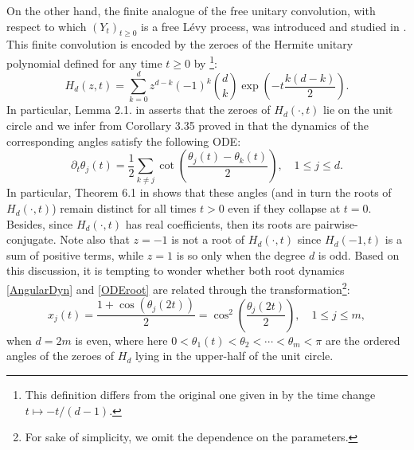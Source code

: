 \documentclass[12pt,reqno]{amsart}
\begin{document}
On the other hand, the finite analogue of the free unitary convolution, with respect to which $(Y_t)_{t \geq 0}$ is a free L\'evy process, was introduced and studied in \cite{MR4285332}. 
This finite convolution is encoded by the zeroes of the Hermite unitary polynomial defined for any time $t \geq 0$ by \cite{MR4912666}\footnote{This definition differs from the original one given in \cite{MR4285332} by the time change $t \mapsto -t/(d-1)$.}: 
$$
H_d(z,t) = \sum_{k=0}^d z^{d-k} (-1)^k \binom{d}{k} \exp\left(-t\frac{k(d-k)}{2}\right).
$$
In particular, Lemma 2.1. in \cite{MR4912666} asserts that the zeroes of $H_d(\cdot, t)$ lie on the unit circle and we infer from Corollary 3.35 proved in \cite{MR4285332} that the dynamics of the corresponding angles satisfy the following ODE: 
\begin{equation}\label{AngularDyn}
\partial_t \theta_j(t) = \frac{1}{2}\sum_{k\neq j} \cot\left(\frac{\theta_j(t) - \theta_k(t)}{2}\right), \quad 1 \leq j \leq d.
\end{equation}
In particular, Theorem 6.1 in \cite{MR4781073} shows that these angles (and in turn the roots of $H_d(\cdot, t)$) remain distinct for all times $t > 0$ even if they collapse at $t=0$. 
Besides, since $H_d(\cdot, t)$ has real coefficients, then its roots are pairwise-conjugate. Note also that $z=-1$ is not a root of $H_d(\cdot, t)$ since $H_d(-1, t)$ is a sum of positive terms, 
while $z=1$ is so only when the degree $d$ is odd. 
Based on this discussion, it is tempting to wonder whether both root dynamics \eqref{AngularDyn} and \eqref{ODEroot} are related through the transformation\footnote{For sake of simplicity, we omit the dependence on the parameters.}: 
\begin{equation*}
x_j(t) = \frac{1+\cos(\theta_j(2t))}{2} = \cos^{2}\left(\frac{\theta_j(2t)}{2}\right), \quad 1 \leq j \leq m,  
\end{equation*}
when $d = 2m$ is even, where here $0< \theta_1(t) < \theta_2 < \cdots < \theta_m < \pi$ are the ordered angles of the zeroes of $H_d$ lying in the upper-half of the unit circle. 
\end{document}
